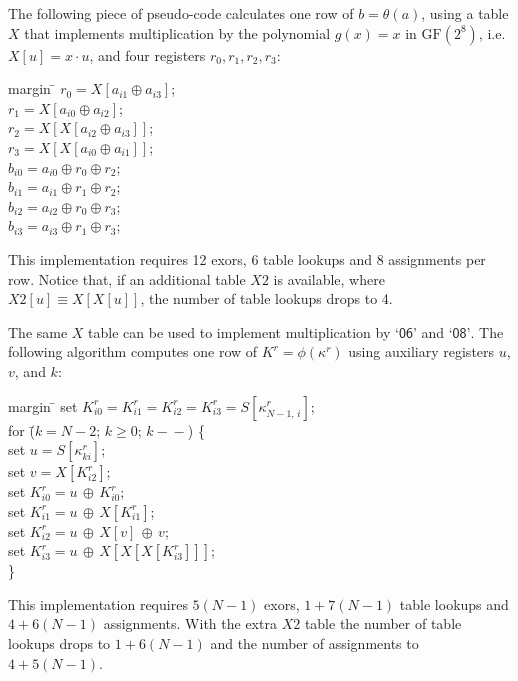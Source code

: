 \documentclass{llncs}
\newcommand{\GF}{\mathrm{GF}}
\newcommand{\gf}[1]{\textsf{`#1'}}
\begin{document}
The following piece of pseudo-code calculates one row of $b =
\theta(a)$, using a table $X$ that implements multiplication by
the polynomial $g(x) = x$ in $\GF(2^8)$, i.e. $X[u] = x \cdot u$,
and four registers $r_0, r_1, r_2, r_3$:
\begin{tabbing}margin \= \kill
\> $r_0 = X[a_{i1} \oplus a_{i3}]$;\\
\> $r_1 = X[a_{i0} \oplus a_{i2}]$;\\
\> $r_2 = X[X[a_{i2} \oplus a_{i3}]]$;\\
\> $r_3 = X[X[a_{i0} \oplus a_{i1}]]$;\\
\> $b_{i0} = a_{i0} \oplus r_0 \oplus r_2$;\\
\> $b_{i1} = a_{i1} \oplus r_1 \oplus r_2$;\\
\> $b_{i2} = a_{i2} \oplus r_0 \oplus r_3$;\\
\> $b_{i3} = a_{i3} \oplus r_1 \oplus r_3$;
\end{tabbing}
This implementation requires 12 exors, 6 table lookups and 8
assignments per row. Notice that, if an additional table $X2$ is
available, where $X2[u] \equiv X[X[u]]$, the number of table
lookups drops to 4.

The same $X$ table can be used to implement multiplication by
$\gf{06}$ and $\gf{08}$. The following algorithm computes one row
of $K^r = \phi(\kappa^r)$ using auxiliary registers $u$, $v$, and
$k$:
\begin{tabbing}margin \= \kill
    \> set $K^r_{i0} = K^r_{i1} = K^r_{i2} = K^r_{i3} = S[\kappa^r_{N-1,\,i}]$; \\
    \> for \= ($k = N - 2$; $k \geqslant 0$; $k\!-\!\!-$) \{ \\
    \>     \> set $u = S[\kappa^r_{ki}]$; \\
    \>     \> set $v = X[K^r_{i2}]$; \\
    \>     \> set $K^r_{i0} = u \,\oplus\, K^r_{i0}$; \\
    \>     \> set $K^r_{i1} = u \,\oplus\, X[K^r_{i1}]$; \\
    \>     \> set $K^r_{i2} = u \,\oplus\, X[v] \,\oplus\, v$; \\
    \>     \> set $K^r_{i3} = u \,\oplus\, X[X[X[K^r_{i3}]]]$; \\
    \> \}
\end{tabbing}
This implementation requires $5(N-1)$ exors, $1 + 7(N-1)$ table
lookups and $4 + 6(N-1)$ assignments. With the extra $X2$ table
the number of table lookups drops to $1 + 6(N-1)$ and the number
of assignments to $4 + 5(N-1)$.
\end{document}

